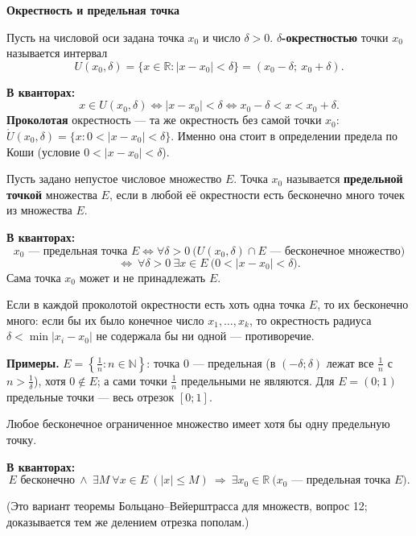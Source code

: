 \documentclass[a4paper,11pt]{article}
\newcommand{\N}{\mathbb{N}}
\newcommand{\R}{\mathbb{R}}
\newcommand{\kv}{\par\noindent\textbf{\textcolor{oprc!85!black}{В кванторах:}}}
\newcommand{\podr}[1]{\par\needspace{8\baselineskip}\medskip
  {\large\bfseries\textcolor{oprc!80!black}{#1}}\par\nopagebreak\smallskip}
\begin{document}
\podr{Окрестность и предельная точка}

\begin{opr}
Пусть на числовой оси задана точка $x_0$ и число $\delta > 0$. \textbf{$\delta$-окрестностью} точки $x_0$ называется интервал
\[
  U(x_0, \delta) = \{x \in \R : |x - x_0| < \delta\} = (x_0 - \delta;\ x_0 + \delta).
\]
\kv
\[
  x \in U(x_0, \delta) \Leftrightarrow |x - x_0| < \delta \Leftrightarrow x_0 - \delta < x < x_0 + \delta.
\]
\textbf{Проколотая} окрестность --- та же окрестность без самой точки $x_0$:
$\mathring{U}(x_0, \delta) = \{x : 0 < |x - x_0| < \delta\}$. Именно она стоит в определении предела по Коши
(условие $0 < |x - x_0| < \delta$).
\end{opr}

\begin{opr}
Пусть задано непустое числовое множество $E$. Точка $x_0$ называется \textbf{предельной точкой} множества $E$, если в любой
её окрестности есть бесконечно много точек из множества $E$.
\kv
\[
  x_0 \text{ --- предельная точка } E \Leftrightarrow \forall \delta > 0\ \bigl(U(x_0, \delta) \cap E \text{ --- бесконечное множество}\bigr)
\]
\[
  \Leftrightarrow\ \forall \delta > 0\ \exists x \in E\ \bigl(0 < |x - x_0| < \delta\bigr).
\]
Сама точка $x_0$ может и не принадлежать $E$.
\end{opr}

\begin{dop}
Если в каждой проколотой окрестности есть хоть одна точка $E$, то их бесконечно много: если бы их было конечное число
$x_1, \dots, x_k$, то окрестность радиуса $\delta < \min |x_i - x_0|$ не содержала бы ни одной --- противоречие.

\textbf{Примеры.} $E = \left\{\frac1n : n \in \N\right\}$: точка $0$ --- предельная (в $(-\delta; \delta)$ лежат все $\frac1n$ с $n > \frac1\delta$),
хотя $0 \notin E$; а сами точки $\frac1n$ предельными не являются. Для $E = (0; 1)$ предельные точки --- весь отрезок $[0; 1]$.
\end{dop}

\begin{teo}
Любое бесконечное ограниченное множество имеет хотя бы одну предельную точку.
\kv
\[
  E \text{ бесконечно} \ \wedge\ \exists M\ \forall x \in E\ (|x| \le M) \ \Longrightarrow\ \exists x_0 \in \R\ \bigl(x_0 \text{ --- предельная точка } E\bigr).
\]
\end{teo}
(Это вариант теоремы Больцано--Вейерштрасса для множеств, вопрос 12; доказывается тем же делением отрезка пополам.)
\end{document}
